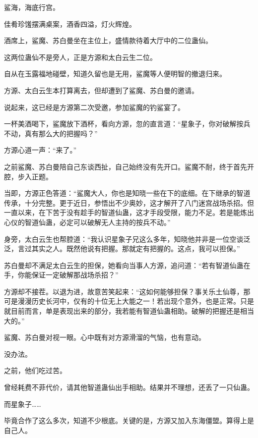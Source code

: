 
\begin{this_body}



鲨海，海底行宫。

佳肴珍馐摆满桌案，酒香四溢，灯火辉煌。

酒席上，鲨魔、苏白曼坐在主位上，盛情款待着大厅中的二位蛊仙。

这两位蛊仙不是旁人，正是方源和太白云生二位。

自从在玉露福地碰壁，知道久留也是无用，鲨魔等人便明智的撤退归来。

方源、太白云生本打算离去，但却遭到了鲨魔、苏白曼的邀请。

说起来，这已经是方源第二次受邀，参加鲨魔的钓鲨宴了。

一杯美酒喝下，鲨魔放下酒杯，看向方源，忽的直言道：“星象子，你对破解按兵不动，真有那么大的把握吗？”

方源心道一声：“来了。”

之前鲨魔、苏白曼陪自己东谈西扯，自己始终没有先开口。鲨魔不耐，终于首先开腔，步入正题。

当即，方源正色答道：“鲨魔大人，你也是知晓一些在下的底细。在下继承的智道传承，十分完整。更于近日，参悟出不少奥妙，这才解开了八门迷宫战场杀招。但一直以来，在下苦于没有趁手的智道仙蛊，这才手段受限，能力不足。若是能炼出心仪的智道仙蛊，必定可以破解无人主持的按兵不动。”

身旁，太白云生也帮腔道：“我认识星象子兄这么多年，知晓他并非是一位空谈泛泛，言过其实之人。既然他说有把握。那就定有把握的。这点，我可以担保。”

苏白曼却不满足太白云生的担保，她看向当事人方源，追问道：“若有智道仙蛊在手，你能保证一定破解那战场杀招？”

方源却不接茬。以退为进，故意苦笑起来：“这如何能够担保？事关乐土仙尊，那可是漫漫历史长河中，仅有的十位无上大能之一！若出现个意外，也是正常。只是就目前而言，单是表现出来的部分，我若能有智道仙蛊相助。破解的把握还是相当大的。”

鲨魔、苏白曼对视一眼。心中既有对方源滑溜的气恼，也有意动。

没办法。

之前，他们吃过苦。

曾经耗费不菲代价，请其他智道蛊仙出手相助。结果并不理想，还丢了一只仙蛊。

而星象子……

毕竟合作了这么多次，知道不少根底。关键的是，方源又加入东海僵盟。算得上是自己人。


\end{this_body}
